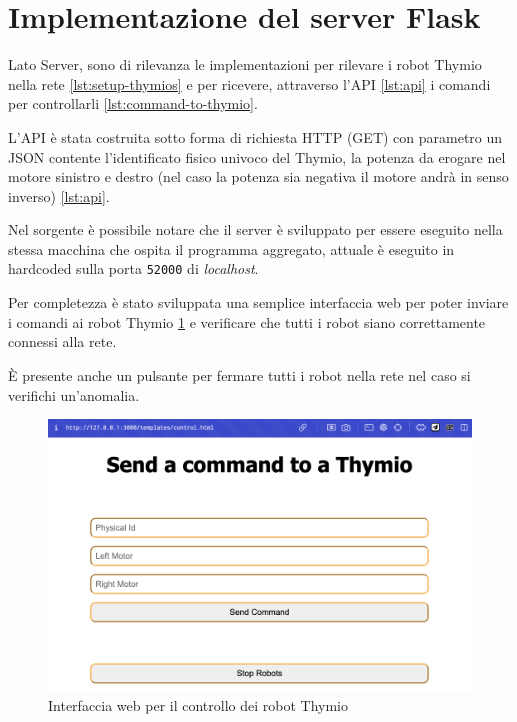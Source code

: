 \documentclass[12pt,a4paper,openright,twoside]{book}
\begin{document}
\section{Implementazione del server Flask}

Lato Server, sono di rilevanza le implementazioni per rilevare i robot Thymio nella rete \cref{lst:setup-thymios} e per ricevere, attraverso l'API \cref{lst:api} i comandi per controllarli \cref{lst:command-to-thymio}.



L'API è stata costruita sotto forma di richiesta HTTP (GET) con parametro un JSON contente l'identificato fisico univoco del Thymio, la potenza da erogare nel motore sinistro e destro (nel caso la potenza sia negativa il motore andrà in senso inverso) \cref{lst:api}.

Nel sorgente è possibile notare che il server è sviluppato per essere eseguito nella stessa macchina che ospita il programma aggregato, attuale è eseguito in hardcoded sulla porta \verb|52000| di \textit{localhost}.





Per completezza è stato sviluppata una semplice interfaccia web per poter inviare i comandi ai robot Thymio \cref{fig:web-interface} e verificare che tutti i robot siano correttamente connessi alla rete.

È presente anche un pulsante per fermare tutti i robot nella rete nel caso si verifichi un'anomalia.

\begin{figure}
    \centering
    \includegraphics[width=.8\linewidth]{figures/web-interface.png}
    \caption{Interfaccia web per il controllo dei robot Thymio}
    \label{fig:web-interface}
\end{figure}
\end{document}
